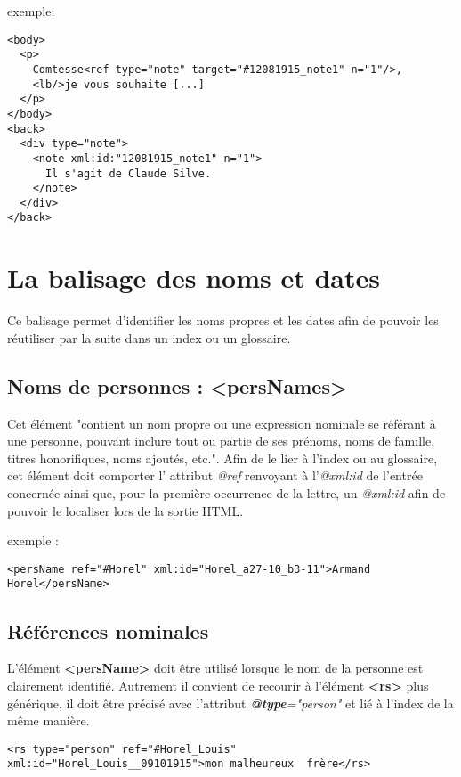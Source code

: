 \documentclass[18pt,a4paper,oneside]{book} %
\begin{document}
exemple:
\begin{lstlisting}
<body>
  <p>
    Comtesse<ref type="note" target="#12081915_note1" n="1"/>, 
    <lb/>je vous souhaite [...]
  </p>
</body>
<back>
  <div type="note">
    <note xml:id:"12081915_note1" n="1">
      Il s'agit de Claude Silve.
    </note>
  </div>
</back>
\end{lstlisting}


\section{La balisage des noms et dates}

Ce balisage permet d'identifier les noms propres et les dates afin de pouvoir les réutiliser par la suite dans un index ou un glossaire.  

\subsection{Noms de personnes : <persNames>}

Cet élément "contient un nom propre ou une expression nominale se référant à une personne, pouvant inclure tout ou partie de ses prénoms, noms de famille, titres honorifiques, noms ajoutés, etc.".
Afin de le lier à l'index ou au glossaire, cet élément doit comporter l' attribut \textit{@ref} renvoyant à l'\textit{@xml:id} de l'entrée concernée ainsi que, pour la première occurrence de la lettre, un \textit{@xml:id} afin de pouvoir le localiser lors de la sortie HTML.
\bigskip 

exemple :
\begin{lstlisting}
<persName ref="#Horel" xml:id="Horel_a27-10_b3-11">Armand Horel</persName> 
\end{lstlisting}

\subsection{Références nominales}
L'élément \textbf{<persName>} doit être utilisé lorsque le nom de la personne est clairement identifié. Autrement il convient de recourir à l'élément \textbf{<rs>} plus générique, il doit être précisé avec l'attribut \textit{\textbf{@type}="person"} et lié à l'index de la même manière.

\begin{lstlisting}
<rs type="person" ref="#Horel_Louis" xml:id="Horel_Louis__09101915">mon malheureux  frère</rs>
\end{lstlisting}
\end{document}
